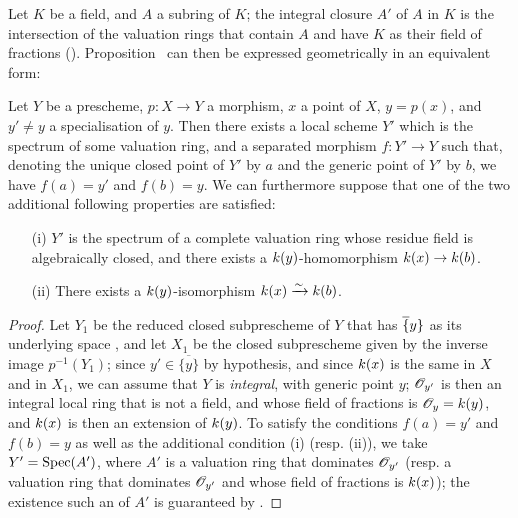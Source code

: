 \begin{env}[7.1.3]
\label{II.7.1.3}
Let $K$ be a field, and $A$ a subring of $K$;
the integral closure $A'$ of $A$ in $K$ is the intersection of the valuation rings that contain $A$ and have $K$ as their field of fractions (\cite[p.~51, th.~2]{I-11}).
Proposition~ can then be expressed geometrically in an equivalent form:
\end{env}

\begin{proposition}[7.1.4]
\label{II.7.1.4}
Let $Y$ be a prescheme, $p:X\to Y$ a morphism, $x$ a point of $X$, $y=p(x)$, and $y'\neq y$ a specialisation  of $y$.
Then there exists a local scheme $Y'$ which is the spectrum of some valuation ring, and a separated morphism $f:Y'\to Y$ such that, denoting the unique closed point of $Y'$ by $a$ and the generic point of $Y'$ by $b$, we have $f(a)=y'$ and $f(b)=y$.
We can furthermore suppose that one of the two additional following properties are satisfied:
\begin{enumerate}
    \item[\rm{(i)}] $Y'$ is the spectrum of a complete valuation ring whose residue field is algebraically closed, and there exists a $k(y)$-homomorphism $\kres(x)\to\kres(b)$.
    \item[\rm{(ii)}] There exists a $k(y)$-isomorphism $k(x)\xrightarrow{\sim}k(b)$.
\end{enumerate}
\end{proposition}

\begin{proof}
Let $Y_1$ be the reduced closed subprescheme of $Y$ that has $\overline\{y\}$ as its underlying space , and let $X_1$ be the closed subprescheme given by the inverse image $p^{-1}(Y_1)$;
since $y'\in\overline{\{y\}}$ by hypothesis, and since $k(x)$ is the same in $X$ and in $X_1$, we can assume that $Y$ is \emph{integral}, with generic point $y$;
$\mathscr{O}_{y'}$ is then an integral local ring that is not a field, and whose field of fractions is $\mathscr{O}_y=k(y)$, and $k(x)$ is then an extension of $k(y)$.
To satisfy the conditions $f(a)=y'$ and $f(b)=y$ as well as the additional condition (i) (resp. (ii)), we take $Y'=\operatorname{Spec}(A')$, where $A'$ is a valuation ring that dominates $\mathscr{O}_{y'}$ (resp. a valuation ring that dominates $\mathscr{O}_{y'}$ and whose field of fractions is $k(x)$);
the existence such an of $A'$ is guaranteed by .
\end{proof}

